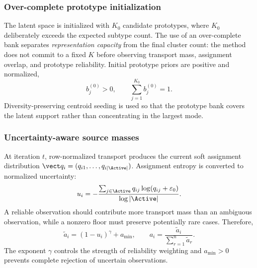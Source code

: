 \subsubsection{Over-complete prototype initialization}
The latent space is initialized with $K_0$ candidate prototypes, where $K_0$ deliberately exceeds the expected subtype count. The use of an over-complete bank separates \emph{representation capacity} from the final cluster count: the method does not commit to a fixed $K$ before observing transport mass, assignment overlap, and prototype reliability. Initial prototype priors are positive and normalized,
\begin{equation}
 b_j^{(0)}>0,
 \qquad
 \sum_{j=1}^{K_0} b_j^{(0)}=1.
\label{eq:initial_priors}
\end{equation}
Diversity-preserving centroid seeding is used so that the prototype bank covers the latent support rather than concentrating in the largest mode.

\subsubsection{Uncertainty-aware source masses}
At iteration $t$, row-normalized transport produces the current soft assignment distribution $\vect q_i=(q_{i1},\ldots,q_{i|\Active|})$. Assignment entropy is converted to normalized uncertainty:
\begin{equation}
 u_i=-\frac{\sum_{j\in\Active}q_{ij}\log(q_{ij}+\varepsilon_0)}
 {\log |\Active|}.
\label{eq:uncertainty}
\end{equation}
A reliable observation should contribute more transport mass than an ambiguous observation, while a nonzero floor must preserve potentially rare cases. Therefore,
\begin{equation}
 \widetilde a_i=(1-u_i)^{\gamma}+a_{\min},
 \qquad
 a_i=\frac{\widetilde a_i}{\sum_{r=1}^{n}\widetilde a_r}.
\label{eq:sample_mass}
\end{equation}
The exponent $\gamma$ controls the strength of reliability weighting and $a_{\min}>0$ prevents complete rejection of uncertain observations.

